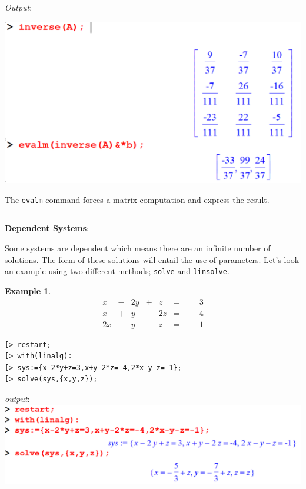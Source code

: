 \documentclass[
]{book}
\theoremstyle{definition}
\theoremstyle{definition}
\newtheorem{example}{Example}[chapter]
\theoremstyle{definition}
\theoremstyle{definition}
\theoremstyle{remark}
\begin{document}
\emph{Output}:

\includegraphics{figures/Lesson 5/fig8.png}

The \texttt{evalm} command forces a matrix computation and express the result.

\begin{center}\rule{0.5\linewidth}{0.5pt}\end{center}

\textbf{Dependent Systems}:

Some systems are dependent which means there are an infinite number of solutions. The form of these solutions will entail the use of parameters.
Let's look an example using two different methods; \texttt{solve} and \texttt{linsolve}.

\begin{example}
\protect\hypertarget{exm:unnamed-chunk-45}{}\label{exm:unnamed-chunk-45}\[
\begin{array}{ccccccccc}
x &-& 2y&+& z &=& &3\\
x &+& y &-& 2z&=&-&4\\
2x&-& y &-& z &=&-&1  
\end{array}
\]
\end{example}

\begin{verbatim}
[> restart;
[> with(linalg):
[> sys:={x-2*y+z=3,x+y-2*z=-4,2*x-y-z=-1};
[> solve(sys,{x,y,z});
\end{verbatim}

\emph{output}:
\includegraphics{figures/Lesson 5/fig9.png}
\end{document}
